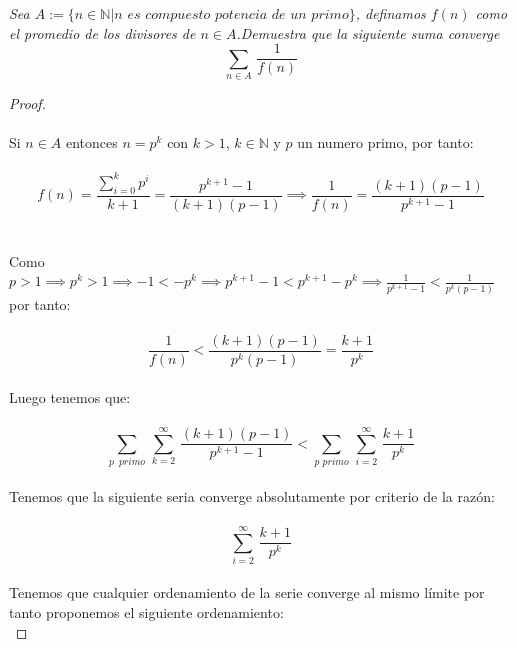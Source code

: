 \documentclass[11pt,letterpaper]{article}
\newcommand{\N}{\mathbb{N}}
\begin{document}
\begin{tcolorbox}[
	title = \textcolor{black}{\textcolor{white}{Problema 2}},]
\textit{Sea $A:=\{n\in \N| n\,\,es \,\,compuesto\,\,potencia\,\,de \,\,un\,\,primo\}$, definamos $f(n)$ como el promedio de los divisores de $n\in A$.Demuestra que la siguiente suma converge\,\\
\begin{equation*}
    \sum_{n\in A}\,\frac{1}{f(n)}
\end{equation*}
}
\end{tcolorbox}
\begin{proof}\,\\
    \,\\
    Si $n\in A$ entonces $n=p^k$ con $k>1$, $k\in \N$ y $p$ un numero primo, por tanto:\,\\
    \,\\
    \begin{equation*}
        f(n)=\frac{\sum_{i=0}^k p^i}{k+1}=\frac{p^{k+1}-1}{(k+1)(p-1)}\implies \frac{1}{f(n)}=\frac{(k+1)(p-1)}{p^{k+1}-1}
    \end{equation*}\,\\
    \,\\
    Como $p>1\implies p^k>1\implies -1<-p^k\implies p^{k+1}-1<p^{k+1}-p^k\implies \frac{1}{p^{k+1}-1}<\frac{1}{p^k(p-1)}$ por tanto:\,\\
    \,\\
    \begin{equation*}
        \frac{1}{f(n)}<\frac{(k+1)(p-1)}{p^k(p-1)}=\frac{k+1}{p^k}
    \end{equation*}\,\\
    Luego tenemos que:\,\\
    \,\\
    \begin{equation*}
        \sum_{p\,\,\,primo}\,\sum_{k=2}^{\infty}\,\frac{(k+1)(p-1)}{p^{k+1}-1}<\sum_{p\,\,primo}\,\sum_{i=2}^{\infty}\,\frac{k+1}{p^k}
    \end{equation*}\,\\
    Tenemos que la siguiente seria converge absolutamente por criterio de la raz\'on:\,\\
    \,\\
    \begin{equation*}
        \sum_{i=2}^{\infty}\,\frac{k+1}{p^k}
    \end{equation*}\,\\
Tenemos que cualquier ordenamiento de la serie converge al mismo l\'imite por tanto proponemos el siguiente ordenamiento:\,\\

\end{proof}
\end{document}
